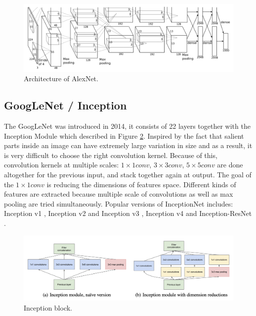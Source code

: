 \begin{figure}[thb]
    \centering
    \includegraphics[width=\textwidth]{endoscopy_resources/alexnet.png}
    \caption{Architecture of AlexNet.  \cite{AlexNet}}
    \label{fig:alexnet_arch}
\end{figure}

\subsection{GoogLeNet / Inception} 
The GoogLeNet \cite{inception} was introduced in 2014, it consists of 22 layers together with the Inception Module which described in Figure \ref{fig:inception_block}. Inspired by the fact that salient parts inside an image can have extremely large variation in size and as a result, it is very difficult to choose the right convolution kernel. Because of this, convolution kernels at multiple scales: $1\times1 conv$, $3\times3 conv$, $5\times5 conv$ are done altogether for the previous input, and stack together again at output. The goal of the $1\times1  conv$ is reducing the dimensions of features space. Different kinds of features are extracted because multiple scale of convolutions as well as max pooling are tried simultaneously. Popular versions of InceptionNet includes: Inception v1 \cite{GoogleLeNet}, Inception v2 and  Inception v3 \cite{InceptionV2}, Inception v4 and Inception-ResNet \cite{InceptionV4}.
\begin{figure}[thb]
    \centering
    \includegraphics[width=\textwidth]{endoscopy_resources/inceptionnet.png}
    \caption{Inception block. \cite{inception}}
    \label{fig:inception_block}
\end{figure}

